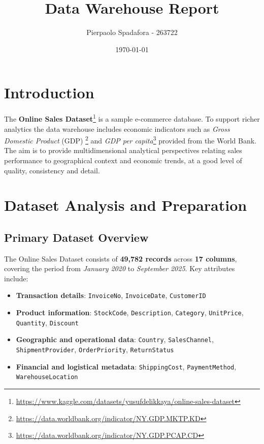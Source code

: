\documentclass[a4paper,11pt]{article}
\title{Data Warehouse Report}
\author{Pierpaolo Spadafora - 263722}
\date{\today}
\begin{document}
\maketitle

\section{Introduction}

The \textbf{Online Sales Dataset}\footnote{\url{https://www.kaggle.com/datasets/yusufdelikkaya/online-sales-dataset}} is a sample e-commerce database.
To support richer analytics the data warehouse includes economic indicators such as \textit{Gross Domestic Product} (GDP) \footnote{\url{https://data.worldbank.org/indicator/NY.GDP.MKTP.KD}} and \textit{GDP per capita}\footnote{\url{https://data.worldbank.org/indicator/NY.GDP.PCAP.CD}} provided from the World Bank.\\
The aim is to provide multidimensional analytical perspectives relating sales performance to geographical context and economic trends, at a good level of quality, consistency and detail.

\section{Dataset Analysis and Preparation}
\subsection{Primary Dataset Overview}
The Online Sales Dataset consists of \textbf{49,782 records} across \textbf{17 columns}, covering the period from \textit{January 2020} to \textit{September 2025}. Key attributes include:
\begin{itemize}
    \item \textbf{Transaction details}: \texttt{InvoiceNo}, \texttt{InvoiceDate}, \texttt{CustomerID}
    \item \textbf{Product information}: \texttt{StockCode}, \texttt{Description}, \texttt{Category}, \texttt{UnitPrice}, \texttt{Quantity}, \texttt{Discount}
    \item \textbf{Geographic and operational data}: \texttt{Country}, \texttt{SalesChannel}, \texttt{ShipmentProvider}, \texttt{OrderPriority}, \texttt{ReturnStatus}
    \item \textbf{Financial and logistical metadata}: \texttt{ShippingCost}, \texttt{PaymentMethod}, \texttt{WarehouseLocation}
\end{itemize}
\end{document}
